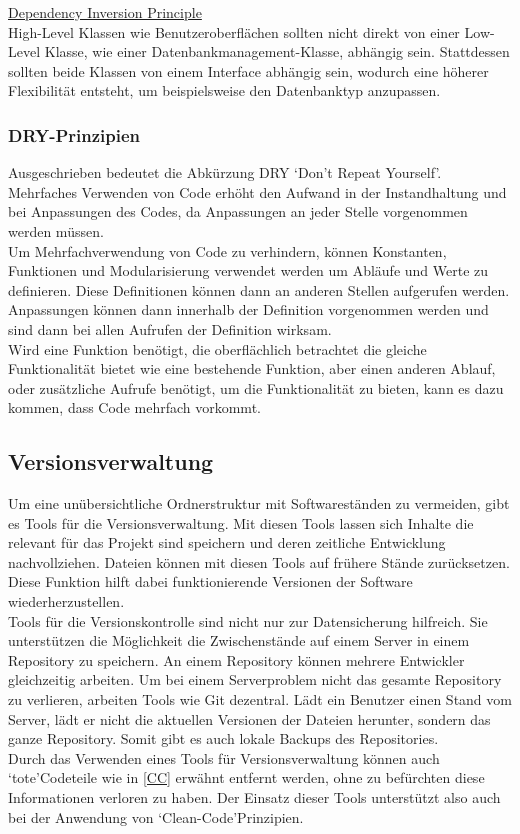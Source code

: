\begin{description}
\item{\underline{Dependency Inversion Principle}}\hfill\\
High-Level Klassen wie Benutzeroberflächen sollten nicht direkt von einer Low-Level Klasse, wie einer Datenbankmanagement-Klasse, abhängig sein. Stattdessen sollten beide Klassen von einem Interface abhängig sein, wodurch eine höherer Flexibilität entsteht, um beispielsweise den Datenbanktyp anzupassen\cite{sarcar2021use}.
\end{description}
\subsubsection{DRY-Prinzipien}
Ausgeschrieben bedeutet die Abkürzung DRY \lq Don't Repeat Yourself\rq \cite{sarcar2021use}. Mehrfaches Verwenden von Code erhöht den Aufwand in der Instandhaltung und bei Anpassungen des Codes, da Anpassungen an jeder Stelle vorgenommen werden müssen\cite{schaffner2013programming}.\\
Um Mehrfachverwendung von Code zu verhindern, können Konstanten, Funktionen und Modularisierung verwendet werden um Abläufe und Werte zu definieren. Diese Definitionen können dann an anderen Stellen aufgerufen werden\cite{schaffner2013programming}. Anpassungen können dann innerhalb der Definition vorgenommen werden und sind dann bei allen Aufrufen der Definition wirksam.\\
Wird eine Funktion benötigt, die oberflächlich betrachtet die gleiche Funktionalität bietet wie eine bestehende Funktion, aber einen anderen Ablauf, oder zusätzliche Aufrufe benötigt, um die Funktionalität zu bieten, kann es dazu kommen, dass Code mehrfach vorkommt.
\subsection{Versionsverwaltung}
\label{Git}
Um eine unübersichtliche Ordnerstruktur mit Softwareständen zu vermeiden, gibt es Tools für die Versionsverwaltung. Mit diesen Tools lassen sich Inhalte die relevant für das Projekt sind speichern und deren zeitliche Entwicklung nachvollziehen. Dateien können mit diesen Tools auf frühere Stände zurücksetzen. Diese Funktion hilft dabei funktionierende Versionen der Software wiederherzustellen.\\
Tools für die Versionskontrolle sind nicht nur zur Datensicherung hilfreich. Sie unterstützen die Möglichkeit die Zwischenstände auf einem Server in einem Repository zu speichern. An einem Repository können mehrere Entwickler gleichzeitig arbeiten. Um bei einem Serverproblem nicht das gesamte Repository zu verlieren, arbeiten Tools wie Git dezentral. Lädt ein Benutzer einen Stand vom Server, lädt er nicht die aktuellen Versionen der Dateien herunter, sondern das ganze Repository. Somit gibt es auch lokale Backups des Repositories\cite{denker2015versionsverwaltung}.\\
Durch das Verwenden eines Tools für Versionsverwaltung können auch \lq tote\rq\space Codeteile wie in \ref{CC} erwähnt entfernt werden, ohne zu befürchten diese Informationen verloren zu haben. Der Einsatz dieser Tools unterstützt also auch bei der Anwendung von \lq Clean-Code\rq\space Prinzipien.
